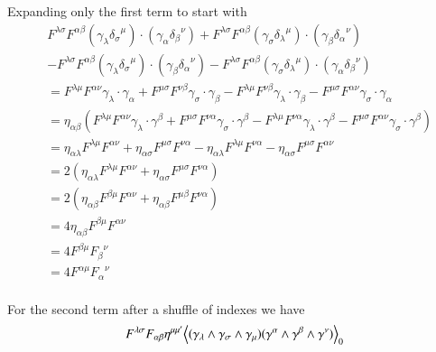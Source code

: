 Expanding only the first term to start with
\begin{align*}
&
F^{\lambda\sigma} F^{\alpha\beta} (\gamma_\lambda {\delta_\sigma}^\mu) \cdot  (\gamma_\alpha {\delta_\beta}^\nu)  
+F^{\lambda\sigma} F^{\alpha\beta} (\gamma_\sigma {\delta_\lambda}^\mu) \cdot (\gamma_\beta {\delta_\alpha}^\nu)  \\
&-F^{\lambda\sigma} F^{\alpha\beta} (\gamma_\lambda {\delta_\sigma}^\mu) \cdot (\gamma_\beta {\delta_\alpha}^\nu) 
-F^{\lambda\sigma} F^{\alpha\beta} (\gamma_\sigma {\delta_\lambda}^\mu) \cdot (\gamma_\alpha {\delta_\beta}^\nu)  \\
&=
F^{\lambda\mu} F^{\alpha\nu} \gamma_\lambda \cdot \gamma_\alpha  
+F^{\mu\sigma} F^{\nu\beta} \gamma_\sigma \cdot \gamma_\beta  
-F^{\lambda\mu} F^{\nu\beta} \gamma_\lambda \cdot \gamma_\beta  
-F^{\mu\sigma} F^{\alpha\nu} \gamma_\sigma \cdot \gamma_\alpha \\
&=
\eta_{\alpha\beta} 
(
F^{\lambda\mu} F^{\alpha\nu} \gamma_\lambda \cdot \gamma^\beta  
+
F^{\mu\sigma} F^{\nu\alpha} \gamma_\sigma \cdot \gamma^\beta  
-
F^{\lambda\mu} F^{\nu\alpha} \gamma_\lambda \cdot \gamma^\beta  
-
F^{\mu\sigma} F^{\alpha\nu} \gamma_\sigma \cdot \gamma^\beta )
\\
&=
\eta_{\alpha\lambda} F^{\lambda\mu} F^{\alpha\nu} + \eta_{\alpha\sigma} F^{\mu\sigma} F^{\nu\alpha} 
- \eta_{\alpha\lambda} F^{\lambda\mu} F^{\nu\alpha} - \eta_{\alpha\sigma} F^{\mu\sigma} F^{\alpha\nu}  \\
&=
2( \eta_{\alpha\lambda} F^{\lambda\mu} F^{\alpha\nu} + \eta_{\alpha\sigma} F^{\mu\sigma} F^{\nu\alpha} ) \\
&=
2( \eta_{\alpha\beta} F^{\beta\mu} F^{\alpha\nu} + 
\eta_{\alpha\beta} F^{\mu\beta} F^{\nu\alpha} ) \\
&=
4 \eta_{\alpha\beta} F^{\beta\mu} F^{\alpha\nu}  \\
&= 4 F^{\beta\mu} {F_{\beta}}^{\nu} \\
&= 4 F^{\alpha\mu} {F_{\alpha}}^{\nu} \\
\end{align*}

For the second term after a shuffle of indexes we have
\begin{align*}
F^{\lambda\sigma} F_{\alpha\beta} 
\eta^{\mu\mu'} {\left\langle{{ (\gamma_\lambda \wedge \gamma_\sigma \wedge \gamma_\mu) (\gamma^\alpha \wedge \gamma^\beta \wedge \gamma^\nu) }}\right\rangle}_{0} \\
\end{align*}

